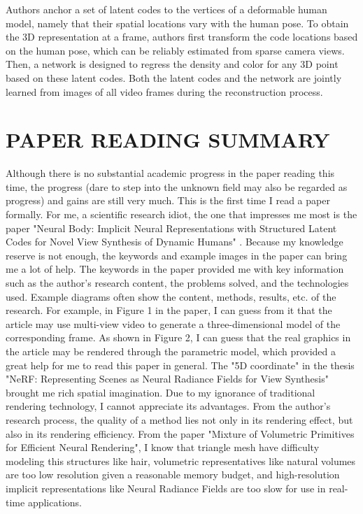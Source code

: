 \documentclass[UTF-8]{ctexart}
\begin{document}
Authors anchor a set of latent codes to the vertices of a deformable human model, namely that their spatial locations vary with the human pose. To obtain the 3D representation at a frame, authors first transform the code locations based on the human pose, which can be reliably estimated from sparse camera views. Then, a network is designed to regress the density and color for any 3D point based on these latent codes. Both the latent codes and the network are jointly learned from images of all video frames during the reconstruction process.

\section{PAPER READING SUMMARY}
Although there is no substantial academic progress in the paper reading this time, the progress (dare to step into the unknown field may also be regarded as progress) and gains are still very much. This is the first time I read a paper formally. For me, a scientific research idiot, the one that impresses me most is the paper "Neural Body: Implicit Neural Representations with Structured Latent Codes for Novel View Synthesis of Dynamic Humans" . Because my knowledge reserve is not enough, the keywords and example images in the paper can bring me a lot of help. The keywords in the paper provided me with key information such as the author's research content, the problems solved, and the technologies used. Example diagrams often show the content, methods, results, etc. of the research. For example, in Figure 1 in the paper, I can guess from it that the article may use multi-view video to generate a three-dimensional model of the corresponding frame. As shown in Figure 2, I can guess that the real graphics in the article may be rendered through the parametric model, which provided a great help for me to read this paper in general. The "5D coordinate" in the thesis "NeRF: Representing Scenes as Neural Radiance Fields for View Synthesis" brought me rich spatial imagination. Due to my ignorance of traditional rendering technology, I cannot appreciate its advantages. From the author's research process, the quality of a method lies not only in its rendering effect, but also in its rendering efficiency. From the paper "Mixture of Volumetric Primitives for Efficient Neural Rendering", I know that triangle mesh have difficulty modeling this structures like hair, volumetric representatives like natural volumes are too low resolution given a reasonable memory budget, and high-resolution implicit representations like Neural Radiance Fields are too slow for use in real-time applications. \par
\end{document}
